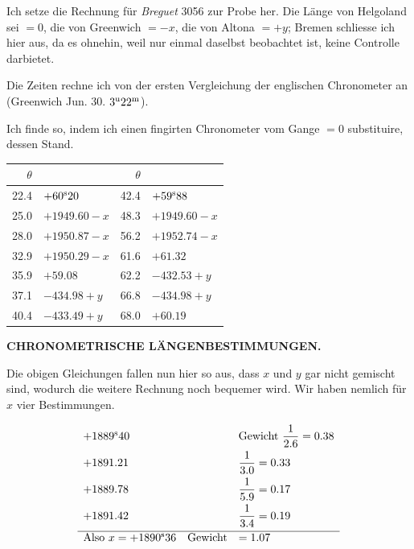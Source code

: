 Ich setze die Rechnung für \emph{Breguet} 3056 zur Probe her. Die Länge von Helgoland sei $=0$, die
von Greenwich $=-x$, die von Altona $=+y$; Bremen schliesse ich hier aus, da es ohnehin, weil nur
einmal daselbst beobachtet ist, keine Controlle darbietet.

Die Zeiten rechne ich von der ersten Vergleichung der englischen Chronometer an (Greenwich
Jun. 30. $3^{\rm u}22^{\rm m}$).

Ich finde so, indem ich einen fingirten Chronometer vom Gange $=0$ substituire, dessen Stand.

\begin{center}
\begin{tabular}{r|l||r|l}
$\theta$ & & $\theta$ & \\
\hline
22.4 & $+60^{\rm s}20$ & 42.4 & $+59^{\rm s}88$ \\
25.0 & $+1949.60-x$ & 48.3 & $+1949.60-x$ \\
28.0 & $+1950.87-x$ & 56.2 & $+1952.74-x$ \\
32.9 & $+1950.29-x$ & 61.6 & $+61.32$ \\
35.9 & $+59.08$ & 62.2 & $-432.53+y$ \\
37.1 & $-434.98+y$ & 66.8 & $-434.98+y$ \\
40.4 & $-433.49+y$ & 68.0 & $+60.19$ \\
\end{tabular}
\end{center}

\clearpage
\thispagestyle{empty}
\noindent{}%
%
\parbox[t]{\dimexpr\linewidth-24mm\relax}{\centering\footnotesize\bfseries CHRONOMETRISCHE LÄNGENBESTIMMUNGEN.\par}%
\makebox[12mm][r]{}\par\nobreak\medskip
Die obigen Gleichungen fallen nun hier so aus, dass $x$ und $y$ gar nicht gemischt sind, wodurch
die weitere Rechnung noch bequemer wird. Wir haben nemlich für $x$ vier Bestimmungen.

\[
\begin{array}{ll}
+1889^{\rm s}40 & \text{Gewicht } \dfrac{1}{2.6}=0.38 \\[7pt]
+1891.21 & \dfrac{1}{3.0}=0.33 \\[7pt]
+1889.78 & \dfrac{1}{5.9}=0.17 \\[7pt]
+1891.42 & \dfrac{1}{3.4}=0.19 \\[7pt]
\hline
\text{Also } x=+1890^{\rm s}36 \quad \text{Gewicht} & =1.07
\end{array}
\]

